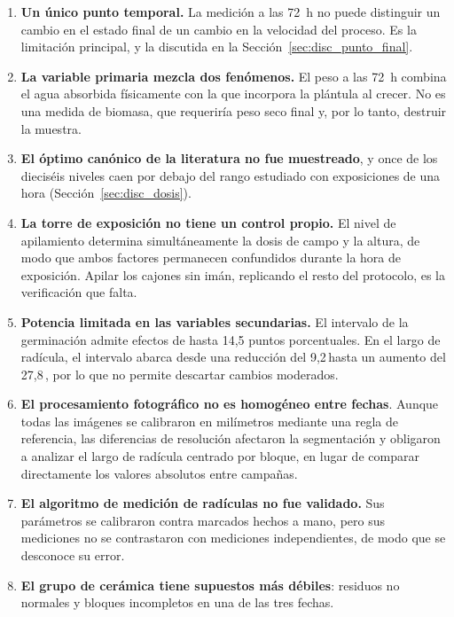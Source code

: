 \begin{enumerate}
    \item \textbf{Un único punto temporal.} La medición a las 72~h no puede distinguir un cambio en el estado final de un cambio en la velocidad del proceso. Es la limitación principal, y la discutida en la Sección~\ref{sec:disc_punto_final}.

    \item \textbf{La variable primaria mezcla dos fenómenos.} El peso a las 72~h combina el agua absorbida físicamente con la que incorpora la plántula al crecer. No es una medida de biomasa, que requeriría peso seco final y, por lo tanto, destruir la muestra.

    \item \textbf{El óptimo canónico de la literatura no fue muestreado}, y once de los dieciséis niveles caen por debajo del rango estudiado con exposiciones de una hora (Sección~\ref{sec:disc_dosis}).

    \item \textbf{La torre de exposición no tiene un control propio.} El nivel de apilamiento determina simultáneamente la dosis de campo y la altura, de modo que ambos factores permanecen confundidos durante la hora de exposición. Apilar los cajones sin imán, replicando el resto del protocolo, es la verificación que falta.

    \item \textbf{Potencia limitada en las variables secundarias.} El intervalo de la germinación admite efectos de hasta 14{,}5 puntos porcentuales. En el largo de radícula, el intervalo abarca desde una reducción del 9{,}2\,\pct hasta un aumento del 27{,}8\,\pct, por lo que no permite descartar cambios moderados.

    \item \textbf{El procesamiento fotográfico no es homogéneo entre fechas}. Aunque todas las imágenes se calibraron en milímetros mediante una regla de referencia, las diferencias de resolución afectaron la segmentación y obligaron a analizar el largo de radícula centrado por bloque, en lugar de comparar directamente los valores absolutos entre campañas.

    \item \textbf{El algoritmo de medición de radículas no fue validado.} Sus parámetros se calibraron contra marcados hechos a mano, pero sus mediciones no se contrastaron con mediciones independientes, de modo que se desconoce su error.

    \item \textbf{El grupo de cerámica tiene supuestos más débiles}: residuos no normales y bloques incompletos en una de las tres fechas.


\end{enumerate}
